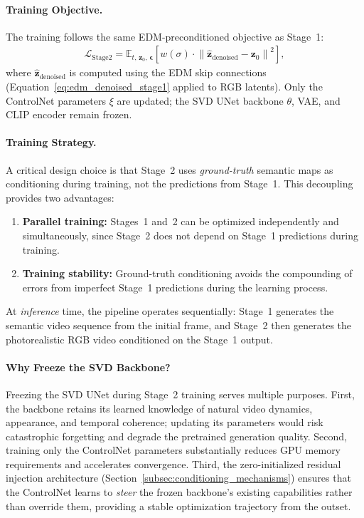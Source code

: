 \paragraph{Training Objective.}
The training follows the same EDM-preconditioned objective as Stage~1:
\begin{align}
    \mathcal{L}_{\text{Stage2}} = \mathbb{E}_{t,\, \mathbf{z}_0,\, \boldsymbol{\epsilon}}\!\left[w(\sigma) \cdot \left\|\hat{\mathbf{z}}_{\text{denoised}} - \mathbf{z}_0\right\|^2\right],
    \label{eq:stage2_loss}
\end{align}
where $\hat{\mathbf{z}}_{\text{denoised}}$ is computed using the EDM skip connections (Equation~\ref{eq:edm_denoised_stage1} applied to RGB latents). Only the ControlNet parameters $\xi$ are updated; the SVD UNet backbone $\theta$, VAE, and CLIP encoder remain frozen.

\paragraph{Training Strategy.}
A critical design choice is that Stage~2 uses \emph{ground-truth} semantic maps as conditioning during training, not the predictions from Stage~1. This decoupling provides two advantages:
\begin{enumerate}
    \item \textbf{Parallel training:} Stages~1 and~2 can be optimized independently and simultaneously, since Stage~2 does not depend on Stage~1 predictions during training.
    \item \textbf{Training stability:} Ground-truth conditioning avoids the compounding of errors from imperfect Stage~1 predictions during the learning process.
\end{enumerate}
At \emph{inference} time, the pipeline operates sequentially: Stage~1 generates the semantic video sequence from the initial frame, and Stage~2 then generates the photorealistic RGB video conditioned on the Stage~1 output.

\paragraph{Why Freeze the SVD Backbone?}
Freezing the SVD UNet during Stage~2 training serves multiple purposes. First, the backbone retains its learned knowledge of natural video dynamics, appearance, and temporal coherence; updating its parameters would risk catastrophic forgetting and degrade the pretrained generation quality. Second, training only the ControlNet parameters substantially reduces GPU memory requirements and accelerates convergence. Third, the zero-initialized residual injection architecture (Section~\ref{subsec:conditioning_mechanisms}) ensures that the ControlNet learns to \emph{steer} the frozen backbone's existing capabilities rather than override them, providing a stable optimization trajectory from the outset.

